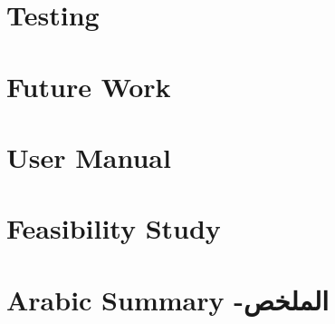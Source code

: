 \documentclass[12pt,twoside]{report}
\begin{document}
	\chapter{Testing}
	
	
	\chapter{Future Work}
	
	
	\renewcommand{\bibname}{References}
	\printbibliography
	
	\appendix
	\chapter{User Manual}
	
	
	\chapter{Feasibility Study}
	
	
	\chapter{Arabic Summary -\textarabic[utf]{الملخص}}
	
\end{document}
